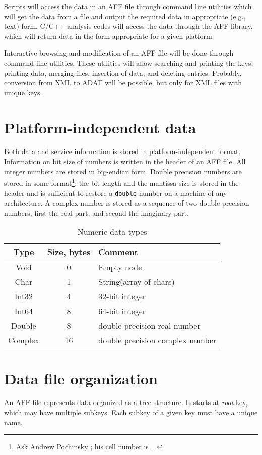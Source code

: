 \documentclass[10pt,letterpaper]{article}
\newcommand{\bc}{\begin{center}}
\newcommand{\ec}{\end{center}}
\newcommand{\term}[1]{\textit{#1}}          %
\newcommand{\ctext}[1]{\texttt{#1}}         %
\newcommand{\ctype}[1]{\ctext{#1}}          %
\begin{document}
Scripts will access the data in an AFF file through command line utilities which will get the
data from a file and output the required data in appropriate (e.g., text) form. C/C++ analysis
codes will access the data through the AFF library, which will return data in the form
appropriate for a given platform.

Interactive browsing and modification of an AFF file will be done through command-line utilities. 
These utilities will allow searching and printing the keys, printing data, merging files,
insertion of data, and deleting entries. Probably, conversion from XML to ADAT will be possible,
but only for XML files with unique keys.


\section{Platform-independent data}
Both data and service information is stored in platform-independent format. 
Information on bit size of numbers is written in the header of an AFF file.
All integer numbers are stored in big-endian form. 
Double precision numbers are stored in some format\footnote{Ask Andrew Pochinsky ; his cell
number is ...}; the bit length and the mantissa size is stored in the header and is sufficient
to restore a \ctype{double} number on a machine of any architecture. 
A complex number is stored as a sequence of two double precision numbers, first the real part,
and second the imaginary part.

\begin{table}[ht]
\label{tab:types}
\bc
\caption{Numeric data types}
\begin{tabular}{c|c|l} \hline
Type & Size, bytes & Comment \\ \hline
Void & 0 & Empty node \\
Char & 1 & String(array of chars) \\
Int32 & 4 & 32-bit integer \\
Int64 & 8 & 64-bit integer \\
Double & 8 & double precision real number \\
Complex & 16 & double precision complex number \\ \hline
\end{tabular}
\ec
\end{table}


\section{Data file organization}
An AFF file represents data organized as a tree structure. 
It starts at \term{root} key, which may have multiple subkeys. 
Each subkey of a given key must have a unique name. 
\end{document}
